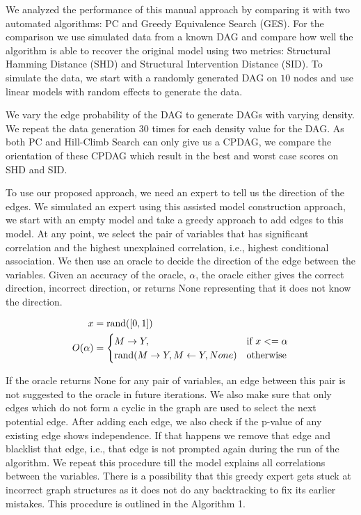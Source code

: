 \documentclass{uai2025} %
\begin{document}
We analyzed the performance of this manual approach by comparing it with two
automated algorithms: PC and Greedy Equivalence Search (GES). For the
comparison we use simulated data from a known DAG and compare how well the
algorithm is able to recover the original model using two metrics: Structural
Hamming Distance (SHD) and Structural Intervention Distance (SID). To simulate
the data, we start with a randomly generated DAG on $ 10 $ nodes and use linear
models with random effects to generate the data. 

We vary the edge probability of the DAG to generate DAGs with varying density.
We repeat the data generation $ 30 $ times for each density value for the DAG.
As both PC and Hill-Climb Search can only give us a CPDAG, we compare the
orientation of these CPDAG which result in the best and worst case scores on
SHD and SID.

To use our proposed approach, we need an expert to tell us the direction of the
edges. We simulated an expert using this assisted model construction approach,
we start with an empty model and take a greedy approach to add edges to this
model. At any point, we select the pair of variables that has significant
correlation and the highest unexplained correlation, i.e., highest conditional
association. We then use an oracle to decide the direction of the edge between
the variables. Given an accuracy of the oracle, $ \alpha $, the oracle either
gives the correct direction, incorrect direction, or returns None representing
that it does not know the direction.

\begin{equation}
	\begin{split}
		x &= \textnormal{rand}([0, 1]) \\
		O(\alpha) &= \begin{cases} 
			M \rightarrow Y, & \textnormal{if  } x <= \alpha \\
			\textnormal{rand}(M \rightarrow Y, M \leftarrow Y, None) & \textnormal{otherwise} \\
				\end{cases} \\
	\end{split}
\end{equation}

If the oracle returns None for any pair of variables, an edge between this pair
is not suggested to the oracle in future iterations. We also make sure that
only edges which do not form a cyclic in the graph are used to select the next
potential edge. After adding each edge, we also check if the p-value of any
existing edge shows independence. If that happens we remove that edge and
blacklist that edge, i.e., that edge is not prompted again during the run of
the algorithm. We repeat this procedure till the model explains all
correlations between the variables. There is a possibility that this greedy
expert gets stuck at incorrect graph structures as it does not do any
backtracking to fix its earlier mistakes. This procedure is outlined in the
Algorithm 1.
\end{document}
